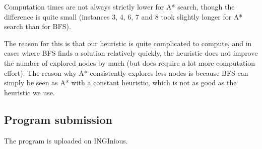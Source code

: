 \documentclass[journal]{IEEEtran}
\begin{document}
Computation times are not always strictly lower for A* search, though the difference is quite small (instances 3, 4, 6, 7 and 8 took slightly longer for A* search than for BFS).

The reason for this is that our heuristic is quite complicated to compute, and in cases where BFS finds a solution relatively quickly, the heuristic does not improve the number of explored nodes by much (but does require a lot more computation effort).
The reason why A* consistently explores less nodes is because BFS can simply be seen as A* with a constant heuristic, which is not as good as the heuristic we use.

\subsection{Program submission}
The program is uploaded on INGInious.
\end{document}
